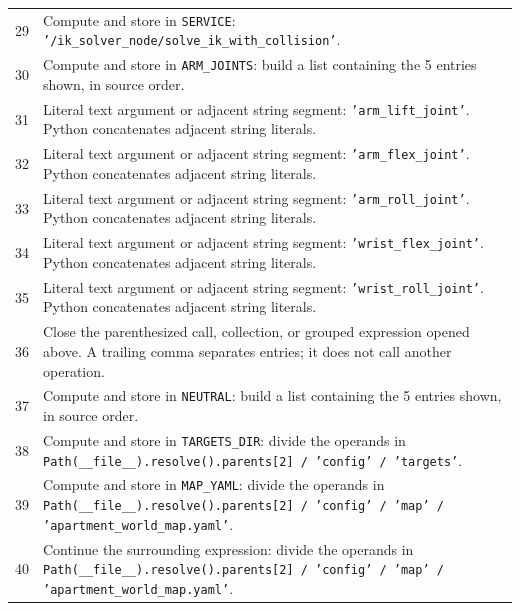 \documentclass[11pt,a4paper]{book}
\begin{document}
\begin{longtable}{r p{}}
29 & Compute and store in \texttt{SERVICE}: \texttt{'/ik\_solver\_node/solve\_ik\_with\_collision'}.  \\

30 & Compute and store in \texttt{ARM\_JOINTS}: build a list containing the 5 entries shown, in source order.  \\

31 & Literal text argument or adjacent string segment: \texttt{'arm\_lift\_joint'}. Python concatenates adjacent string literals. \\

32 & Literal text argument or adjacent string segment: \texttt{'arm\_flex\_joint'}. Python concatenates adjacent string literals. \\

33 & Literal text argument or adjacent string segment: \texttt{'arm\_roll\_joint'}. Python concatenates adjacent string literals. \\

34 & Literal text argument or adjacent string segment: \texttt{'wrist\_flex\_joint'}. Python concatenates adjacent string literals. \\

35 & Literal text argument or adjacent string segment: \texttt{'wrist\_roll\_joint'}. Python concatenates adjacent string literals. \\

36 & Close the parenthesized call, collection, or grouped expression opened above. A trailing comma separates entries; it does not call another operation. \\

37 & Compute and store in \texttt{NEUTRAL}: build a list containing the 5 entries shown, in source order.  \\

38 & Compute and store in \texttt{TARGETS\_DIR}: divide the operands in \texttt{Path(\_\_file\_\_).resolve().parents[2] / 'config' / 'targets'}.  \\

39 & Compute and store in \texttt{MAP\_YAML}: divide the operands in \texttt{Path(\_\_file\_\_).resolve().parents[2] / 'config' / 'map' / 'apartment\_world\_map.yaml'}.  \\

40 & Continue the surrounding expression: divide the operands in \texttt{Path(\_\_file\_\_).resolve().parents[2] / 'config' / 'map' / 'apartment\_world\_map.yaml'}. \\


\end{longtable}
\end{document}
